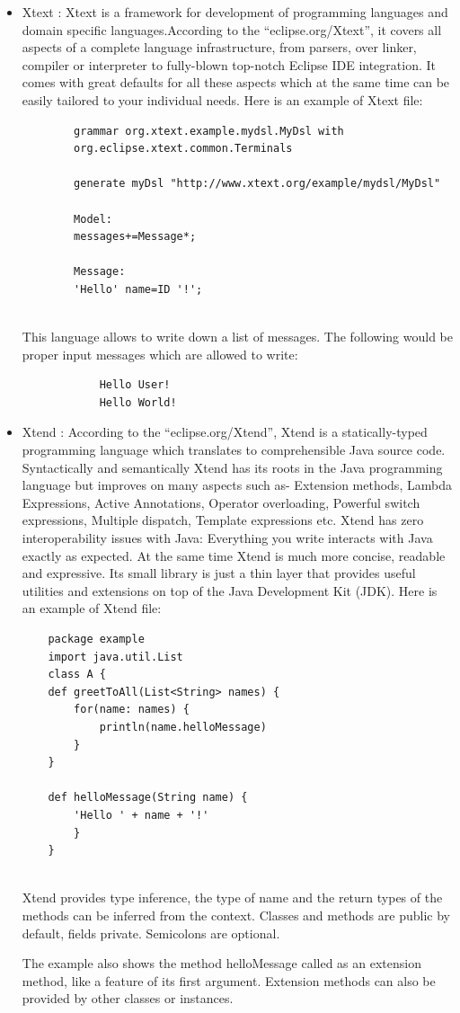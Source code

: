 \begin{itemize}	
	\item Xtext : Xtext is a framework for development of programming languages and domain specific languages.According to the \enquote{eclipse.org/Xtext}, it covers all aspects of a complete language infrastructure, from parsers, over linker, compiler or interpreter to fully-blown top-notch Eclipse IDE integration. It comes with great defaults for all these aspects which at the same time can be easily tailored to your individual needs.
	Here is an example of Xtext file:
		\begin{lstlisting}
		grammar org.xtext.example.mydsl.MyDsl with 
		org.eclipse.xtext.common.Terminals
		
		generate myDsl "http://www.xtext.org/example/mydsl/MyDsl"
		
		Model:
		messages+=Message*;
		
		Message:
		'Hello' name=ID '!';
		
		\end{lstlisting}
		 
	This language allows to write down a list of messages. The following would be proper input messages which are allowed to write:
		\begin{lstlisting}
			Hello User!
			Hello World!		
		\end{lstlisting}
	
	\item Xtend : According to the \enquote{eclipse.org/Xtend}, Xtend is a statically-typed programming language which translates to comprehensible Java source code. Syntactically and semantically Xtend has its roots in the Java programming language but improves on many aspects such as- Extension methods, Lambda Expressions, Active Annotations, Operator overloading, Powerful switch expressions, Multiple dispatch, Template expressions etc. Xtend has zero interoperability issues with Java: Everything you write interacts with Java exactly as expected. At the same time Xtend is much more concise, readable and expressive. Its small library is just a thin layer that provides useful utilities and extensions on top of the Java Development Kit (JDK). 
	Here is an example of Xtend file:
	\begin{lstlisting}
	package example	
	import java.util.List		
	class A {
	def greetToAll(List<String> names) {
		for(name: names) {
			println(name.helloMessage)
		}
	}
		
	def helloMessage(String name) {
		'Hello ' + name + '!'
		}
	}
	
	\end{lstlisting} 
	   
Xtend provides type inference, the type of name and the return types of the methods can be inferred from the context. Classes and methods are public by default, fields private. Semicolons are optional.
	
The example also shows the method helloMessage called as an extension method, like a feature of its first argument. Extension methods can also be provided by other classes or instances.
\end{itemize}


